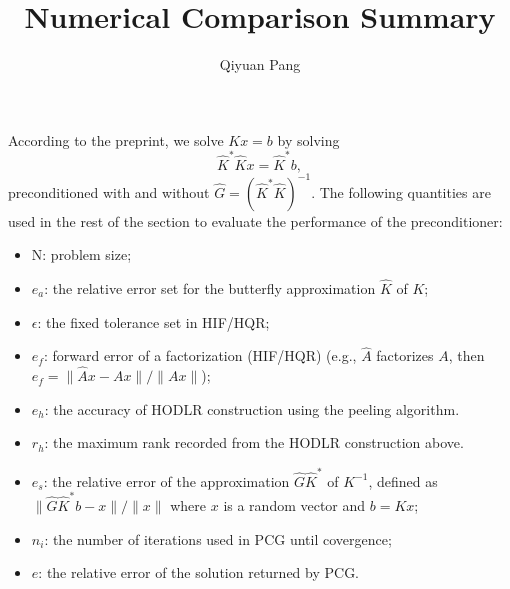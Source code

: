 \documentclass[11pt]{article}
\begin{document}
\title{Numerical Comparison Summary}
\author{Qiyuan Pang}

\maketitle

According to the preprint, we solve $K x = b$ by solving 
\begin{equation*}
\hat{K}^{*}\hat{K}x = \hat{K}^{*}b,
\end{equation*}
preconditioned with and without $\hat{G} = (\hat{K}^{*}\hat{K})^{-1}$. The following quantities are used in the rest of the section to
evaluate the performance of the preconditioner:

\begin{itemize}
\item N: problem size;
\item $e_{a}$: the relative error set for the butterfly approximation $\hat{K}$ of $K$;
\item $\epsilon$: the fixed tolerance set in HIF/HQR;
\item $e_{f}$: forward error of a factorization (HIF/HQR) (e.g., $\hat{A}$ factorizes $A$, then $e_{f} = \|\hat{A}x-Ax\|/\|Ax\|$);
\item $e_{h}$: the accuracy of HODLR construction using the peeling algorithm.
\item $r_{h}$: the maximum rank recorded from the HODLR construction above.
\item $e_{s}$: the relative error of the approximation $\hat{G}\hat{K}^{*}$ of $K^{-1}$, defined as $\|\hat{G}\hat{K}^{*}b - x\|/\|x\|$ where $x$ is a random vector and $b = Kx$;
\item $n_{i}$: the number of iterations used in PCG until covergence;
\item $e$: the relative error of the solution returned by PCG.
\end{itemize}
\end{document}
